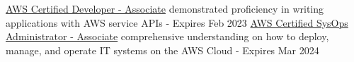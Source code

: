 

\begin{cvskills}

  \cvskill
  {\href{https://www.credly.com/badges/7123e224-cb17-4171-88dd-f34dc9c0af8e}{AWS Certified Developer - Associate}}
  {demonstrated proficiency in writing applications with AWS service APIs - Expires Feb 2023}
  \cvskill
  {\href{https://www.credly.com/badges/c7e21149-77de-45cd-b8a7-c6e2896a95ed}{AWS Certified SysOps Administrator - Associate}}
  {
    comprehensive understanding on how to deploy, 
    manage, and \newline operate IT systems on the AWS Cloud - Expires Mar 2024
  }
  
\end{cvskills}
